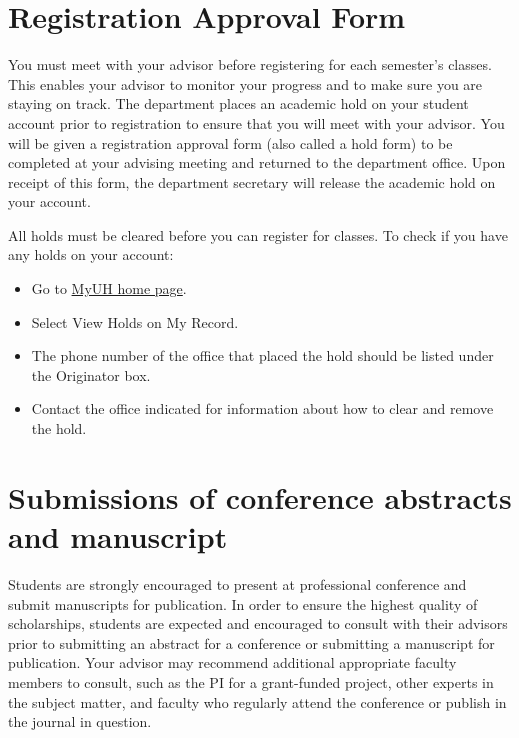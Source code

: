 \documentclass[
]{book}
\providecommand{\tightlist}{%
  \setlength{\itemsep}{0pt}\setlength{\parskip}{0pt}}
\begin{document}
\hypertarget{registration-approval-form}{%
\section{Registration Approval Form}\label{registration-approval-form}}

You must meet with your advisor before registering for each semester's classes. This enables your advisor to monitor your progress and to make sure you are staying on track. The department places an academic hold on your student account prior to registration to ensure that you will meet with your advisor. You will be given a registration approval form (also called a hold form) to be completed at your advising meeting and returned to the department office. Upon receipt of this form, the department secretary will release the academic hold on your account.

All holds must be cleared before you can register for classes. To check if you have any holds on your account:

\begin{itemize}
\tightlist
\item
  Go to \href{https://myuh.hawaii.edu/}{MyUH home page}.
\item
  Select View Holds on My Record.
\item
  The phone number of the office that placed the hold should be listed under the Originator box.
\item
  Contact the office indicated for information about how to clear and remove the hold.
\end{itemize}

\hypertarget{submissions-of-conference-abstracts-and-manuscript}{%
\section{Submissions of conference abstracts and manuscript}\label{submissions-of-conference-abstracts-and-manuscript}}

Students are strongly encouraged to present at professional conference and submit manuscripts for publication. In order to ensure the highest quality of scholarships, students are expected and encouraged to consult with their advisors prior to submitting an abstract for a conference or submitting a manuscript for publication. Your advisor may recommend additional appropriate faculty members to consult, such as the PI for a grant-funded project, other experts in the subject matter, and faculty who regularly attend the conference or publish in the journal in question.
\end{document}
